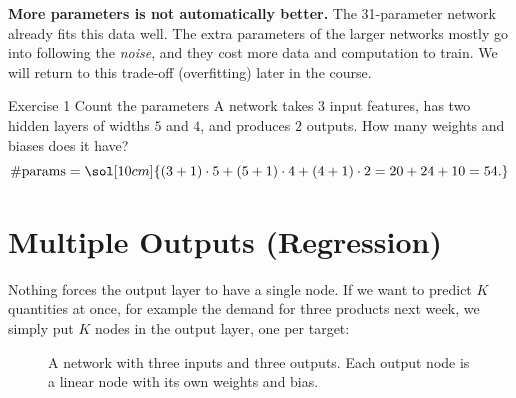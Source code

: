 \documentclass[12pt, a4paper]{article}
\begin{document}

\begin{warnbox}
  \textbf{More parameters is not automatically better.}
  The 31-parameter network already fits this data well. The extra
  parameters of the larger networks mostly go into following the
  \emph{noise}, and they cost more data and computation to train.
  We will return to this trade-off (overfitting) later in the course.
\end{warnbox}

\begin{stepbox}{Exercise 1 \quad Count the parameters}
  A network takes $3$ input features, has two hidden layers of widths
  $5$ and $4$, and produces $2$ outputs. How many weights and biases does
  it have?
  \[
    \#\text{params}
    = \sol[10cm]{(3+1)\cdot 5 + (5+1)\cdot 4 + (4+1)\cdot 2 = 20 + 24 + 10 = 54.}
  \]
\end{stepbox}

\section{Multiple Outputs (Regression)}

Nothing forces the output layer to have a single node. If we want to predict
$K$ quantities at once, for example the demand for three products next week,
we simply put $K$ nodes in the output layer, one per target:

\begin{figure}[H]
  \centering
  \caption{A network with three inputs and three outputs. Each output node is
    a linear node with its own weights and bias.}
  \label{fig:multi-output}
\end{figure}
\end{document}
